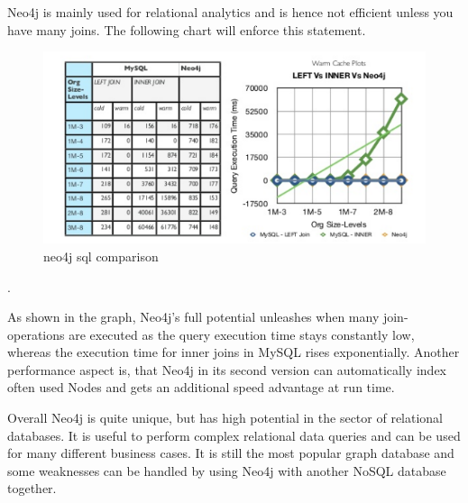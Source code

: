 Neo4j is mainly used for relational analytics and is hence not efficient unless you have many joins. The following chart will enforce this statement.

\begin{figure}[H]
	\includegraphics[width=\linewidth,keepaspectratio]{images/neo4j/neo4j_joins.png}
	\caption{neo4j sql comparison}
\end{figure}  
\cite[slide 19]{Dalal.2014}.

As shown in the graph, Neo4j's full potential unleashes when many join-operations are executed as the query execution time stays constantly low, whereas the execution time for inner joins in MySQL rises exponentially. Another performance aspect is, that Neo4j in its second version can automatically index often used Nodes and gets an additional speed advantage at run time.

Overall Neo4j is quite unique, but has high potential in the sector of relational databases.
It is useful to perform complex relational data queries and can be used for many different business cases.
It is still the most popular graph database and some weaknesses can be handled by using Neo4j with another NoSQL database together.
